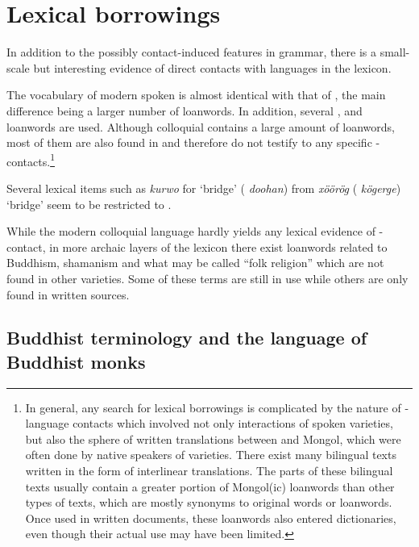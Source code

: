 \documentclass[output=paper,colorlinks,citecolor=brown]{langscibook}
\begin{document}
\section{Lexical borrowings}\label{section9.4}

In addition to the possibly contact-induced features in  grammar, there is a small-scale but interesting evidence of direct contacts with  languages in the  lexicon.

The vocabulary of modern spoken  is almost identical with that of , the main difference being a larger number of  loanwords. In addition, several ,  and  loanwords are used. Although colloquial  contains a large amount of  loanwords, most of them are also found in  and therefore do not testify to any specific - contacts.\footnote{ In general, any search for lexical borrowings is complicated by the nature of - language contacts which involved not only interactions of spoken varieties, but also the sphere of written translations between  and Mongol, which were often done by native speakers of  varieties. There exist many bilingual texts written in the form of interlinear translations. The  parts of these bilingual texts usually contain a greater portion of Mongol(ic) loanwords than other types of  texts, which are mostly synonyms to original  words or  loanwords. Once used in written documents, these  loanwords also entered  dictionaries, even though their actual use may have been limited.}

Several lexical items such as \textit{kurwo} for ‘bridge’ ( \textit{doohan}) from  \textit{xöörög} ( \textit{kögerge}) ‘bridge’ seem to be restricted to .

While the modern colloquial language hardly yields any lexical evidence of - contact, in more archaic layers of the lexicon there exist  loanwords related to Buddhism, shamanism and what may be called “folk religion” which are not found in other  varieties. Some of these terms are still in use while others are only found in written sources.

\subsection{Buddhist terminology and the language of Buddhist monks}
\end{document}

